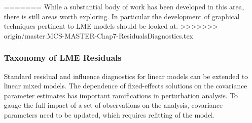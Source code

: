 \documentclass[12pt, a4paper]{report}
\theoremstyle{plain}
\theoremstyle{definition}
\theoremstyle{remark}
\begin{document}
	
	
	
=======
While a substantial body of work has been developed in this area, there is still areas worth exploring. In particular the development of graphical techniques pertinent to LME models should be looked at.
>>>>>>> origin/master:MCS-MASTER-Chap7-ResidualsDiagnostics.tex
	
	
	
	
%	
%	
%
%	


%

	\subsubsection{Taxonomy of LME Residuals}
	Standard residual and influence diagnostics for linear models can
	be extended to linear mixed models. The dependence of
	fixed-effects solutions on the covariance parameter estimates has
	important ramifications in perturbation analysis. To gauge the
	full impact of a set of observations on the analysis, covariance
	parameters need to be updated, which requires refitting of the
	model.
\end{document}
